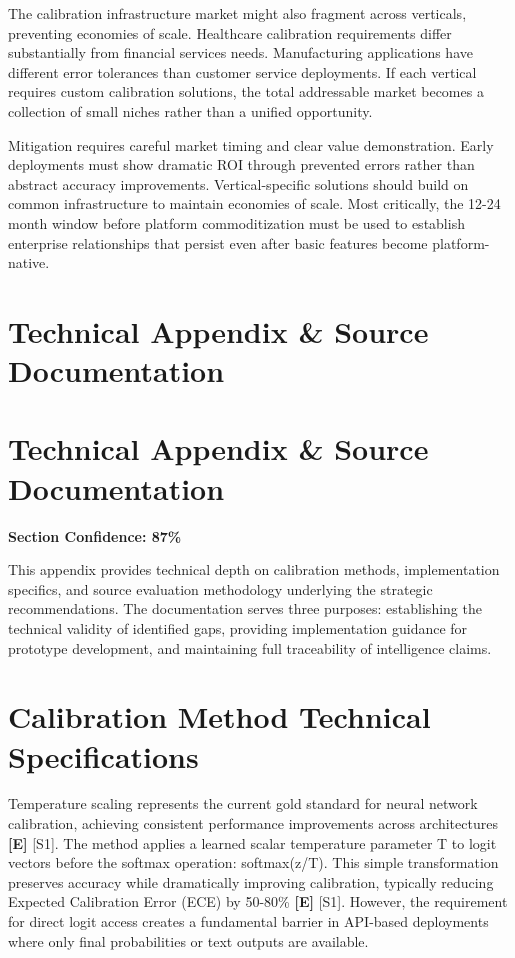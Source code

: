 \documentclass[a4paper,11pt]{article}
\newcommand{\elabel}{\textbf{\textcolor{ecolor}{[E]}}}
\begin{document}
The calibration infrastructure market might also fragment across verticals, preventing economies of scale. Healthcare calibration requirements differ substantially from financial services needs. Manufacturing applications have different error tolerances than customer service deployments. If each vertical requires custom calibration solutions, the total addressable market becomes a collection of small niches rather than a unified opportunity.


Mitigation requires careful market timing and clear value demonstration. Early deployments must show dramatic ROI through prevented errors rather than abstract accuracy improvements. Vertical-specific solutions should build on common infrastructure to maintain economies of scale. Most critically, the 12-24 month window before platform commoditization must be used to establish enterprise relationships that persist even after basic features become platform-native.

\clearpage
\section{Technical Appendix \& Source Documentation}

\section{Technical Appendix \& Source Documentation}

\textbf{Section Confidence: 87\%}\par

This appendix provides technical depth on calibration methods, implementation specifics, and source evaluation methodology underlying the strategic recommendations. The documentation serves three purposes: establishing the technical validity of identified gaps, providing implementation guidance for prototype development, and maintaining full traceability of intelligence claims.


\section{Calibration Method Technical Specifications}

Temperature scaling represents the current gold standard for neural network calibration, achieving consistent performance improvements across architectures \elabel{} \textcolor{primary}{[S1]}. The method applies a learned scalar temperature parameter T to logit vectors before the softmax operation: softmax(z/T). This simple transformation preserves accuracy while dramatically improving calibration, typically reducing Expected Calibration Error (ECE) by 50-80\% \elabel{} \textcolor{primary}{[S1]}. However, the requirement for direct logit access creates a fundamental barrier in API-based deployments where only final probabilities or text outputs are available.
\end{document}
